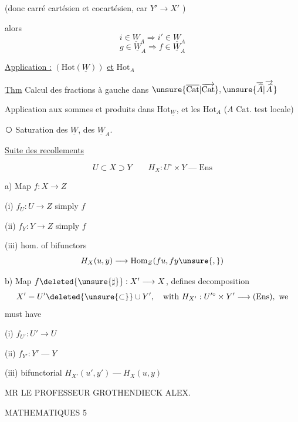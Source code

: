 (donc carré cartésien et cocartésien, car $Y'\longrightarrow X'$ )


alors 
\[
i\in\underline W_A\Rightarrow i'\in\underline W_A
\]
\[
g\in\underline W_A\Rightarrow f\in\underline W_A
\]

 \uline{Application :} $(\mathrm{Hot}(\underline W))$ \uline{et} $\mathrm{Hot}_A$

\uline{Thm} Calcul des fractions à gauche dans $\unsure{\overline{\mathrm{Cat}}|\overrightarrow{\mathrm{Cat}}},\unsure{\overline{\widehat A}|\overrightarrow{\widehat A}}$

Application aux sommes et produits dans $\mathrm{Hot}_{\underline W}$,
et les $\mathrm{Hot}_A$ ($A$ Cat. test locale)

\textcircled{}  Saturation  des $\underline W$, des $\underline W_A$.

\hrulefill


\uline{Suite des recollements}

\[
U\subset X\supset Y\qquad H_X:U^\circ\times Y\mathbin{\text{---}}\mathrm{Ens}
\]

a) Map  $f:X\longrightarrow Z$

(i) $f_U:U\longrightarrow Z$ simply $f$

(ii) $f_Y:Y\longrightarrow Z$ simply $f$

(iii) hom. of bifunctors
\[
H_X(u,y)\longrightarrow\mathrm{Hom}_Z(fu,fy\unsure{,})
\]

b) Map $f\deleted{\unsure{\sharp}}:X'\longrightarrow X$, defines decomposition
\[
X'=U'\deleted{\unsure{\subset}}\cup Y',\quad\text{with }H_{X'}:U'^\circ\times Y'\longrightarrow(\mathrm{Ens}),\text{ we}
\]
must have

(i) $f_{U'}:U'\longrightarrow U$

(ii) $f_{Y'}:Y'\mathbin{\text{---}}Y$

(iii) bifunctorial $H_{X'}(u',y')\mathbin{\text{---}}H_X(u,y)$

\begin{center}
MR LE PROFESSEUR GROTHENDIECK ALEX.

MATHEMATIQUES \hfill 5
\end{center}

